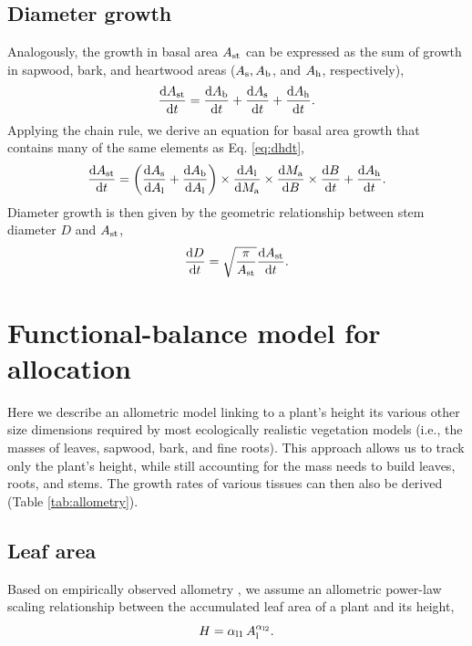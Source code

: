 \documentclass[10pt,twoside]{article}
\begin{document}
\subsection{Diameter growth}

Analogously, the growth in basal area $A_{\rm st}$ can be
expressed as the sum of growth in sapwood, bark, and heartwood areas
($A_{\rm s}, A_{\rm b}$, and $A_{\rm h}$, respectively),
$$\frac{{\rm d}A_{\rm st}}{{\rm d}t} = \frac{{\rm d}A_{\rm b}}{{\rm d}t} + \frac{{\rm d}A_{\rm s}}{{\rm d}t} + \frac{{\rm d}A_{\rm h}}{{\rm d}t}.$$
Applying the chain rule, we derive an equation for basal area growth that contains many of the same
elements as Eq. \ref{eq:dhdt},
\begin{equation}\label{eq:dast}
\frac{{\rm d}A_{\rm st}}{{\rm d}t} = \left(\frac{{\rm d}A_{\rm s}}{{\rm d}A_{\rm l}} + \frac{{\rm d}A_{\rm b}}{{\rm d}A_{\rm l}}\right) \times
\frac{{\rm d}A_{\rm l}}{{\rm d}M_{\rm a}} \times \frac{{\rm d}M_{\rm a}}{{\rm d}B} \times \frac{{\rm d}B}{{\rm d}t} + \frac{{\rm d}A_{\rm h}}{{\rm d}t} .
\end{equation}
Diameter growth is then given by the geometric relationship between stem
diameter $D$ and $A_{\rm st}$,
\begin{equation} \label{eq:dDdt}
\frac{{\rm d}D}{{\rm d}t} = \sqrt{\frac{\pi}{A_{\rm st}}} \frac{{\rm d}A_{\rm st}}{{\rm d}t}.
\end{equation}

\section{Functional-balance model for
allocation}\label{a-functional-balance-model-for-allocation}

Here we describe an allometric model linking to a plant's height its various other size dimensions
required by most ecologically realistic vegetation models
(i.e., the masses of leaves, sapwood, bark, and fine
roots). This approach allows us to track only the
plant's height, while still accounting for the mass needs to build
leaves, roots, and stems. The growth rates of various tissues can then
also be derived (Table \ref{tab:allometry}).

\subsection{Leaf area}\label{leaf-area}


Based on empirically observed allometry \citep{Falster-2011}, we assume an allometric power-law
scaling relationship between the accumulated leaf area of a plant and
its height,
\begin{equation}\label{eq:ha}
H = \alpha_{{\rm l1}} \, A_{\rm l}^{\alpha_{{\rm l2}}}.
\end{equation}
\end{document}
